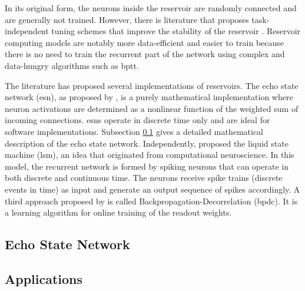 In its original form, the neurons inside the reservoir are randomly connected and are generally not trained. 
However, there is literature that proposes task-independent tuning schemes that improve the stability of the reservoir \citep{lukosevicius_reservoir_2009, norton_preparing_2006, tanaka_effect_2020}.
Reservoir computing models are notably more data-efficient and easier to train because there is no need to train the recurrent part of the network using complex and data-hungry algorithms such as \acrshort{bptt}.


The literature has proposed several implementations of reservoirs.
The echo state network (\acrshort{esn}), as proposed by \citet{jaeger_echo_2002}, is a purely mathematical implementation where neuron activations are determined as a nonlinear function of the weighted sum of incoming connections. 
\acrshort{esn}s operate in discrete time only and are ideal for software implementations.
Subsection \ref{subsection:esn} gives a detailed mathematical description of the echo state network.
Independently, \citet{maass_real-time_2002} proposed the liquid state machine (\acrshort{lsm}), an idea that originated from computational neuroscience.
In this model, the recurrent network is formed by spiking neurons that can operate in both discrete and continuous time.
The neurons receive spike trains (discrete events in time) as input and generate an output sequence of spikes accordingly.
A third approach proposed by \citet{steil_backpropagation-decorrelation_2004} is called Backpropagation-Decorrelation (\acrshort{bpdc}). 
It is a learning algorithm for online training of the readout weights.


\subsection{Echo State Network} \label{subsection:esn}



\subsection{Applications} \label{subsection:rc_applications}

